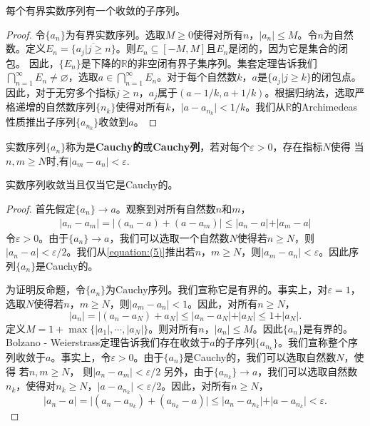 \documentclass[lang=cn,newtx,10pt,scheme=chinese]{elegantbook}
\begin{document}
\begin{theorem}\label{theorem:Bolzano - Weierstrass定理}
  每个有界实数序列有一个收敛的子序列。
\end{theorem}
\begin{proof}
  令\(\{a_n\}\)为有界实数序列。选取\(M\geqslant0\)使得对所有\(n\)，\(\vert a_n\vert\leqslant M\)。令\(n\)为自然数。定义\(E_n=\overline{\{a_j|j\geqslant n\}}\)。则\(E_n\subseteq[-M,M]\)且\(E_n\)是闭的，因为它是集合的闭包。 因此，\(\{E_n\}\)是下降的\(\mathbb{R}\)的非空闭有界子集序列。集套定理告诉我们\(\bigcap_{n = 1}^{\infty}E_n\neq\varnothing\)，选取\(a\in\bigcap_{n = 1}^{\infty}E_n\)。对于每个自然数\(k\)，\(a\)是\(\{a_j|j\geqslant k\}\)的闭包点。 因此，对于无穷多个指标\(j\geqslant n\)，\(a_j\)属于\((a - 1/k,a + 1/k)\)。根据归纳法，选取严格递增的自然数序列\(\{n_k\}\)使得对所有\(k\)，\(\vert a - a_{n_k}\vert<1/k\)。我们从\(\mathbb{R}\)的Archimedeas性质推出子序列\(\{a_{n_k}\}\)收敛到\(a\)。
\end{proof}

\begin{definition}
  实数序列\(\{a_n\}\)称为是\textbf{Cauchy的}或\textbf{Cauchy列}，若对每个\(\varepsilon>0\)，存在指标\(N\)使得
  当\(n,m\geqslant N\)时,有\(\vert a_m - a_n\vert<\varepsilon\).
\end{definition}

\begin{theorem}[实数序列的Cauchy收敛准则]\label{theorem:实数序列的Cauchy收敛准则}
  实数序列收敛当且仅当它是Cauchy的。
\end{theorem}
\begin{proof}
  首先假定\(\{a_n\}\to a\)。观察到对所有自然数\(n\)和\(m\)，
  \begin{align}\label{equation:(5)}
    \vert a_n - a_m\vert=\vert(a_n - a)+(a - a_m)\vert\leqslant\vert a_n - a\vert+\vert a_m - a\vert
  \end{align}
  令\(\varepsilon>0\)。由于\(\{a_n\}\to a\)，我们可以选取一个自然数\(N\)使得若\(n\geqslant N\)，则\(\vert a_n - a\vert<\varepsilon/2\)。我们从\eqref{equation:(5)}推出若\(n\)，\(m\geqslant N\)，则\(\vert a_m - a_n\vert<\varepsilon\)。因此序列\(\{a_n\}\)是Cauchy的。
  
  为证明反命题，令\(\{a_n\}\)为Cauchy序列。我们宣称它是有界的。事实上，对\(\varepsilon = 1\)，选取\(N\)使得若\(n\)，\(m\geqslant N\)，则\(\vert a_m - a_n\vert<1\)。因此，对所有\(n\geqslant N\)，
  \[\vert a_n\vert=\vert(a_n - a_N)+a_N\vert\leqslant\vert a_n - a_N\vert+\vert a_N\vert\leqslant1+\vert a_N\vert.\]
  定义\(M = 1+\max\{\vert a_1\vert, \cdots, \vert a_N\vert\}\)。则对所有\(n\)，\(\vert a_n\vert\leqslant M\)。因此\(\{a_n\}\)是有界的。Bolzano - Weierstrass定理告诉我们存在收敛于\(a\)的子序列\(\{a_{n_k}\}\)。我们宣称整个序列收敛于\(a\)。事实上，令\(\varepsilon>0\)。由于\(\{a_n\}\)是Cauchy的，我们可以选取自然数\(N\)，使得
  若\(n,m\geqslant N\)， 则\(\vert a_n - a_m\vert<\varepsilon/2\)
  另外，由于\(\{a_{n_k}\}\to a\)，我们可以选取自然数\(n_k\)，使得对\(n_k\geqslant N\)，\(\vert a - a_{n_k}\vert<\varepsilon/2\)。因此，对所有\(n\geqslant N\)，
  \[\vert a_n - a\vert=\vert(a_n - a_{n_k})+(a_{n_k}-a)\vert\leqslant\vert a_n - a_{n_k}\vert+\vert a - a_{n_k}\vert<\varepsilon.\]
\end{proof}
\end{document}
